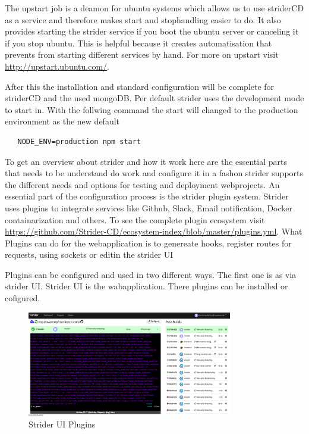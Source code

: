 The upstart job is a deamon for ubuntu systems which allows us to use striderCD as a service and therefore makes start and
stophandling easier to do. It also provides starting the strider service if you boot the ubuntu server or canceling it if you
stop ubuntu. This is helpful because it creates automatisation that prevents from starting different services by hand. For more on
upstart visit \url{http://upstart.ubuntu.com/}.

After this the installation and standard configuration will be complete for striderCD and the used mongoDB. Per default
strider uses the development mode to start in. With the follwing command the start will changed to the production environment
as the new default
\begin{lstlisting}
   NODE_ENV=production npm start
\end{lstlisting}

To get an overview about strider and how it work here are the essential parts that needs to be understand do work and configure
it in a fashon strider supports the different needs and options for testing and deployment webprojects. An essential part of
the configuration process is the strider plugin system. Strider uses plugins to integrate services like Github, Slack, Email
notification, Docker containarization and others. To see the complete plugin ecosystem visit \url{https://github.com/Strider-CD/ecosystem-index/blob/master/plugins.yml}.
What Plugins can do for the webapplication is to genereate hooks, register routes for requests, using sockets or editin the strider
UI

Plugins can be configured and used in two different ways. The first one is as via strider UI. Strider UI is the wabapplication.
There plugins can be installed or cofigured.

\begin{figure}[h!]
  \centering
      \includegraphics[width=0.8\textwidth]{images/striderUI.png}
  \caption{Strider UI Plugins}
\end{figure}

